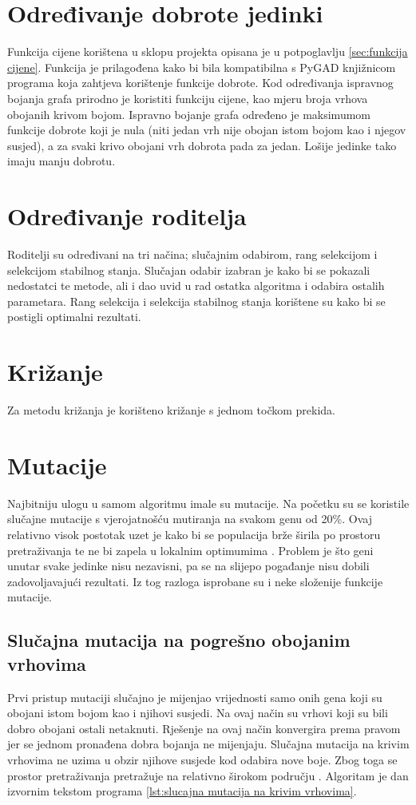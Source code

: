 \documentclass[times, utf8, zavrsni, numeric]{fer}
\begin{document}
\section{Određivanje dobrote jedinki}
Funkcija cijene korištena u sklopu projekta opisana je u potpoglavlju \ref{sec:funkcija cijene}. Funkcija je prilagođena kako bi bila kompatibilna s PyGAD knjižnicom programa koja zahtjeva korištenje funkcije dobrote. Kod određivanja ispravnog bojanja grafa prirodno je koristiti funkciju cijene, kao mjeru broja vrhova obojanih krivom bojom. Ispravno bojanje grafa određeno je maksimumom funkcije dobrote koji je nula (niti jedan vrh nije obojan istom bojom kao i njegov susjed), a za svaki krivo obojani vrh dobrota pada za jedan. Lošije jedinke tako imaju manju dobrotu.

\section{Određivanje roditelja}
Roditelji su određivani na tri načina; slučajnim odabirom, rang selekcijom i selekcijom stabilnog stanja. Slučajan odabir izabran je kako bi se pokazali nedostatci te metode, ali i dao uvid u rad ostatka algoritma i odabira ostalih parametara. Rang selekcija i selekcija stabilnog stanja korištene su kako bi se postigli optimalni rezultati.

\section{Križanje}
Za metodu križanja je korišteno križanje s jednom točkom prekida.

\section{Mutacije}
Najbitniju ulogu u samom algoritmu imale su mutacije. Na početku su se koristile slučajne mutacije s vjerojatnošću mutiranja na svakom genu od 20\%. Ovaj relativno visok postotak uzet je kako bi se populacija brže širila po prostoru pretraživanja te ne bi zapela u lokalnim optimumima \cite{geeksforgeeks}. Problem je što geni unutar svake jedinke nisu nezavisni, pa se na slijepo pogađanje nisu dobili zadovoljavajući rezultati. Iz tog razloga isprobane su i neke složenije funkcije mutacije. 

\subsection{Slučajna mutacija na pogrešno obojanim vrhovima}
\label{sec: slucajna mutacija na krivim vrhovima}
Prvi pristup mutaciji slučajno je mijenjao vrijednosti samo onih gena koji su obojani istom bojom kao i njihovi susjedi. Na ovaj način su vrhovi koji su bili dobro obojani ostali netaknuti. Rješenje na ovaj način konvergira prema pravom jer se jednom pronađena dobra bojanja ne mijenjaju. Slučajna mutacija na krivim vrhovima ne uzima u obzir njihove susjede kod odabira nove boje. Zbog toga se prostor pretraživanja pretražuje na relativno širokom području \cite{hindi2012genetic}. Algoritam je dan izvornim tekstom programa \ref{lst:slucajna mutacija na krivim vrhovima}.
\end{document}

